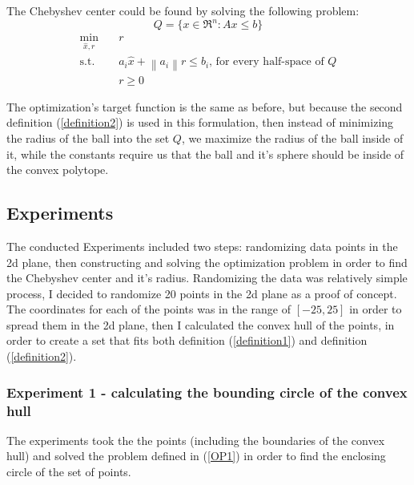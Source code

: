 \documentclass[]{article}
\newcommand{\norm}[1]{\left\lVert#1\right\rVert}
\newcommand{\Q}[0]{\textit{Q}}
\begin{document}
The Chebyshev center could be found by solving the following problem:
\[\Q = \{ x\in \Re^n : Ax\leq b\}\]
\begin{equation}
	\label{LP}
	\begin{aligned}
		\min_{\hat{x},r} \quad &r \\
		\text{s.t.}\quad & a_i \hat{x} + \norm{a_i}r \leq b_i \text{, for every half-space of } \Q \\
		\quad & r\geq 0
	\end{aligned}
\end{equation}

The optimization's target function is the same as before, but because the second definition (\ref{definition2}) is used in this formulation, then instead of minimizing the radius of the ball into the set $\Q$, we maximize the radius of the ball inside of it, while the constants require us that the ball and it's sphere should be inside of the convex polytope.
 
\subsection{Experiments}

The conducted Experiments included two steps: randomizing data points in the 2d plane, then constructing and solving the optimization problem in order to find the Chebyshev center and it's radius.
Randomizing the data was relatively simple process, I decided to randomize 20 points in the 2d plane as a proof of concept. The coordinates for each of the points was in the range of $[-25,25]$ in order to spread them in the 2d plane, then I calculated the convex hull of the points, in order to create a set that fits both definition (\ref{definition1}) and definition (\ref{definition2}).

\subsubsection{Experiment 1 - calculating the bounding circle of the convex hull}

The experiments took the the points (including the boundaries of the convex hull) and solved the problem defined in (\ref{OP1}) in order to find the enclosing circle of the set of points.
\end{document}
